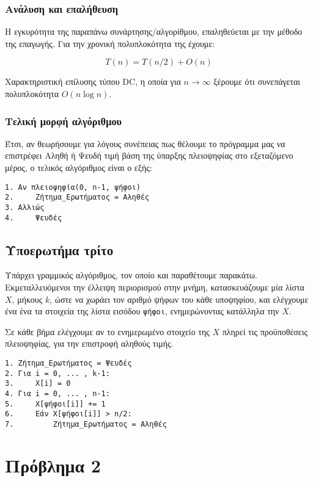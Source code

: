 \documentclass[a4paper,11pt]{article}
\begin{document}
\subsubsection{Ανάλυση και επαλήθευση}
\label{sec:org0a724a6}
Η εγκυρότητα της παραπάνω συνάρτησης/αλγορίθμου, επαληθεύεται με την μέθοδο της
επαγωγής. Για την χρονική πολυπλοκότητα της έχουμε:

\begin{equation}
\label{eq:4}
T(n) = T(n/2) + O(n)
\end{equation}

Χαρακτηριστική επίλυσης τύπου DC, η οποία για \(n\to\infty\) ξέρουμε ότι
συνεπάγεται πολυπλοκότητα \(O(n\log{n})\).

\subsubsection{Τελική μορφή αλγόριθμου}
\label{sec:org170594a}
Έτσι, αν θεωρήσουμε για λόγους συνέπειας πως θέλουμε το πρόγραμμα μας να
επιστρέφει Αληθή ή Ψευδή τιμή βάση της ύπαρξης πλειοψηφίας στο εξεταζόμενο
μέρος, ο τελικός αλγόριθμος είναι ο εξής:
\begin{verbatim}
1. Αν πλειοψηφία(0, n-1, ψήφοι)
2.     Ζήτημα_Ερωτήματος = Αληθές
3. Αλλιώς
4.     Ψευδές
\end{verbatim}


\subsection{Υποερωτήμα τρίτο}
\label{sec:org87b52f3}
Υπάρχει γραμμικός αλγόριθμος, τον οποίο και παραθέτουμε παρακάτω.
Εκμεταλλευόμενοι την έλλειψη περιορισμού στην μνήμη, κατασκευάζουμε μία λίστα \(X\),
μήκους \(k\), ώστε να χωράει τον αριθμό ψήφων του κάθε υποψηφίου, και ελέγχουμε
ένα ένα τα στοιχεία της λίστα εισόδου \texttt{ψήφοι}, ενημερώνοντας κατάλληλα την \(X\).

Σε κάθε βήμα ελέγχουμε αν το ενημερωμένο στοιχείο της \(X\) πληρεί τις
προϋποθέσεις πλειοψηφίας, για την επιστροφή αληθούς τιμής.

\begin{verbatim}
1. Ζήτημα_Ερωτήματος = Ψευδές
2. Για i = 0, ... , k-1:	
3.     Χ[i] = 0
4. Για i = 0, ... , n-1:
5.     X[ψήφοι[i]] += 1
6.     Εάν X[ψήφοι[i]] > n/2:
7.         Ζήτημα_Ερωτήματος = Αληθές
\end{verbatim}

\section{Πρόβλημα 2}
\label{sec:orgc1856a8}
\end{document}

